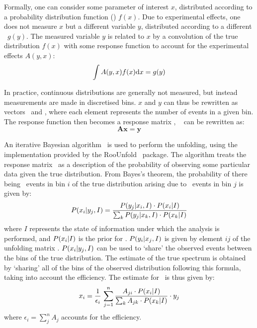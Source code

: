 Formally, one can consider some parameter of interest $x$,
distributed according to a probability distribution function (\probDF) $f(x)$. Due to experimental effects, one
does not measure $x$ but a different variable $y$, distributed
according to a different \probDF\ $g(y)$. The measured variable $y$ is related to $x$ by a
convolution of the true distribution $f(x)$ with some response function to account for the
experimental effects $A(y,x)$:
\begin{equation}
\int A(y,x)f(x){\rm d}x = g(y)
\label{eqn:unfold-conv}
\end{equation}

In practice, continuous distributions are generally not measured, but instead
measurements are made
in discretised bins. $x$ and $y$ can thus be rewritten as
vectors \unfx\ and \unfy, where each element represents the number of events in
a given bin. The response
function then becomes a response matrix \unfA, ~ can be
rewritten as:
\begin{equation}
\mathbf{Ax} = \mathbf{y}
\label{eqn:unfold-conv-matrix}
\end{equation}

An iterative Bayesian algorithm~\cite{2010arXiv1010.0632D} is used to perform
the unfolding, 
using the implementation provided by the {\sc
RooUnfold}~\cite{2011arXiv1105.1160A} package. The algorithm treats the response
matrix \unfA\ as a description of the probability of observing some particular data given the
true distribution. From Bayes's theorem, the probability of there being 
\unfxi\ events in bin $i$ of the true distribution arising due to
\unfyj\ events in bin $j$ is given by:
\begin{equation}
P(x_i|y_j,I) = \frac{P(y_j|x_i,I)\cdot P(x_i|I)}{\sum_{k}P(y_j|x_k,I)\cdot P(x_k|I)}
\end{equation}
where $I$ represents the state of information under which the analysis is
performed, and $P(x_i|I)$ is the prior for \unfxi. $P(y_i|x_j,I)$ is
given by element $ij$ of the unfolding matrix \unfA. $P(x_i|y_j,I)$ can be used to `share' the observed events between the bins of the
true distribution. The estimate of the true spectrum is obtained by 
`sharing' all of the bins of the observed distribution following this formula, taking into
account the efficiency. The estimate for \unfxi\ is thus given by:
\begin{equation}
x_i = \frac{1}{\epsilon_{i}} \, \sum^{n}_{j=1} \frac{A_{ji} \cdot
P(x_i|I)}{\sum_{k} A_{jk} \cdot P(x_k|I)} \cdot y_j
\end{equation}
where $\epsilon_{i}=\sum^{n}_{j} A_{j}$ accounts for the efficiency.

